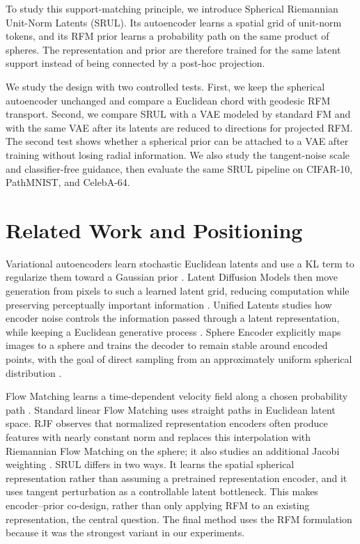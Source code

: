 \documentclass{article}
\begin{document}
To study this support-matching principle, we introduce Spherical Riemannian Unit-Norm Latents (SRUL). Its autoencoder learns a spatial grid of unit-norm tokens, and its RFM prior learns a probability path on the same product of spheres. The representation and prior are therefore trained for the same latent support instead of being connected by a post-hoc projection.

We study the design with two controlled tests. First, we keep the spherical autoencoder unchanged and compare a Euclidean chord with geodesic RFM transport. Second, we compare SRUL with a VAE modeled by standard FM and with the same VAE after its latents are reduced to directions for projected RFM. The second test shows whether a spherical prior can be attached to a VAE after training without losing radial information. We also study the tangent-noise scale and classifier-free guidance, then evaluate the same SRUL pipeline on CIFAR-10, PathMNIST, and CelebA-64.

\section{Related Work and Positioning}
Variational autoencoders learn stochastic Euclidean latents and use a KL term to regularize them toward a Gaussian prior \cite{vae}. Latent Diffusion Models then move generation from pixels to such a learned latent grid, reducing computation while preserving perceptually important information \cite{ldm}. Unified Latents studies how encoder noise controls the information passed through a latent representation, while keeping a Euclidean generative process \cite{ul}. Sphere Encoder explicitly maps images to a sphere and trains the decoder to remain stable around encoded points, with the goal of direct sampling from an approximately uniform spherical distribution \cite{sphere}.

Flow Matching learns a time-dependent velocity field along a chosen probability path \cite{fm}. Standard linear Flow Matching uses straight paths in Euclidean latent space. RJF observes that normalized representation encoders often produce features with nearly constant norm and replaces this interpolation with Riemannian Flow Matching on the sphere; it also studies an additional Jacobi weighting \cite{rjf}. SRUL differs in two ways. It learns the spatial spherical representation rather than assuming a pretrained representation encoder, and it uses tangent perturbation as a controllable latent bottleneck. This makes encoder--prior co-design, rather than only applying RFM to an existing representation, the central question. The final method uses the RFM formulation because it was the strongest variant in our experiments.
\end{document}
